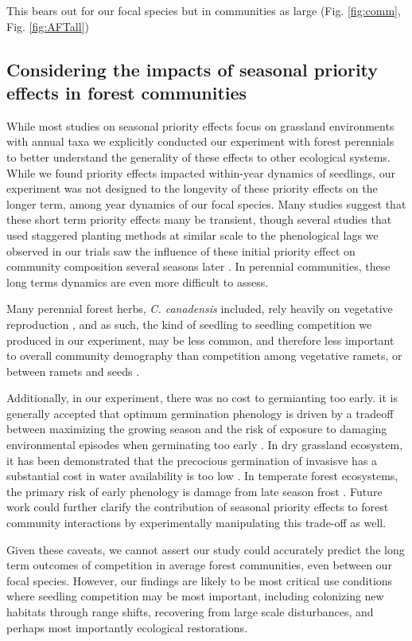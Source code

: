 \documentclass{article}\usepackage[]{graphicx}\usepackage[]{color}
\begin{document}
This bears out for our focal species but in communities as large (Fig. \ref{fig:comm}, Fig. \ref{fig:AFTall})

\subsection*{Considering the impacts of seasonal priority effects in forest communities}
While most studies on seasonal priority effects focus on grassland environments with annual taxa \citep{} we explicitly conducted our experiment with forest perennials to better understand the generality of these effects to other ecological systems. While we found priority effects impacted within-year dynamics of seedlings, our experiment was not designed to the longevity of these priority effects on the longer term, among year dynamics of our focal species. Many studies suggest that these short term priority effects many be transient, though several studies that used staggered planting methods at similar scale to the phenological lags we observed in our trials saw the influence of these initial priority effect on community composition several seasons later \citep{}.  In perennial communities, these long terms dynamics are even more difficult to assess.

Many perennial forest herbs, \textit{C. canadensis} included, rely heavily on vegetative reproduction \citep{}, and as such, the kind of seedling to seedling competition we produced in our experiment, may be less common, and therefore less important to overall community demography than competition among vegetative ramets, or between ramets and seeds \citep{}. 

Additionally, in our experiment, there was no cost to germianting too early. it is generally accepted that optimum germination phenology is driven by a tradeoff between maximizing the growing season and the risk of exposure to damaging environmental episodes when germinating too early \citep{}. In dry grassland ecosystem, it has been demonstrated that the precocious germination of invasisve has a substantial cost in water availability is too low \citep{}. In temperate forest ecosystems, the primary risk of early phenology is damage from late season frost \citep{}. Future work could further clarify the contribution of seasonal priority effects to forest community interactions by experimentally manipulating this trade-off as well.

Given these caveats, we cannot assert our study could accurately predict the long term outcomes of competition in average forest communities, even between our focal species. However, our findings are likely to be most critical use conditions where seedling competition may be most important, including colonizing new habitats through range shifts, recovering from large scale disturbances, and perhaps most importantly ecological restorations.
\end{document}
